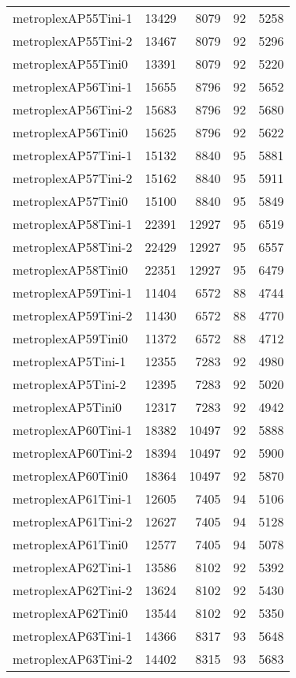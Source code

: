 \begin{longtable}{lrrrr}
metroplexAP55Tini-1 & 13429 & 8079 & 92 & 5258 \\
metroplexAP55Tini-2 & 13467 & 8079 & 92 & 5296 \\
metroplexAP55Tini0 & 13391 & 8079 & 92 & 5220 \\
metroplexAP56Tini-1 & 15655 & 8796 & 92 & 5652 \\
metroplexAP56Tini-2 & 15683 & 8796 & 92 & 5680 \\
metroplexAP56Tini0 & 15625 & 8796 & 92 & 5622 \\
metroplexAP57Tini-1 & 15132 & 8840 & 95 & 5881 \\
metroplexAP57Tini-2 & 15162 & 8840 & 95 & 5911 \\
metroplexAP57Tini0 & 15100 & 8840 & 95 & 5849 \\
metroplexAP58Tini-1 & 22391 & 12927 & 95 & 6519 \\
metroplexAP58Tini-2 & 22429 & 12927 & 95 & 6557 \\
metroplexAP58Tini0 & 22351 & 12927 & 95 & 6479 \\
metroplexAP59Tini-1 & 11404 & 6572 & 88 & 4744 \\
metroplexAP59Tini-2 & 11430 & 6572 & 88 & 4770 \\
metroplexAP59Tini0 & 11372 & 6572 & 88 & 4712 \\
metroplexAP5Tini-1 & 12355 & 7283 & 92 & 4980 \\
metroplexAP5Tini-2 & 12395 & 7283 & 92 & 5020 \\
metroplexAP5Tini0 & 12317 & 7283 & 92 & 4942 \\
metroplexAP60Tini-1 & 18382 & 10497 & 92 & 5888 \\
metroplexAP60Tini-2 & 18394 & 10497 & 92 & 5900 \\
metroplexAP60Tini0 & 18364 & 10497 & 92 & 5870 \\
metroplexAP61Tini-1 & 12605 & 7405 & 94 & 5106 \\
metroplexAP61Tini-2 & 12627 & 7405 & 94 & 5128 \\
metroplexAP61Tini0 & 12577 & 7405 & 94 & 5078 \\
metroplexAP62Tini-1 & 13586 & 8102 & 92 & 5392 \\
metroplexAP62Tini-2 & 13624 & 8102 & 92 & 5430 \\
metroplexAP62Tini0 & 13544 & 8102 & 92 & 5350 \\
metroplexAP63Tini-1 & 14366 & 8317 & 93 & 5648 \\
metroplexAP63Tini-2 & 14402 & 8315 & 93 & 5683 \\

\end{longtable}

